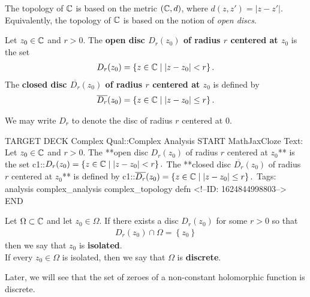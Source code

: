 \documentclass{memoir}
\begin{document}
The topology of \(\mathbb{C}\) is based on the metric \((\mathbb{C},d)\), where \(d(z,z') = \left| z-z' \right| \).  Equivalently, the topology of \(\mathbb{C}\) is based on the notion of \textit{open discs}.
\begin{defn}
	Let \(z_0 \in \mathbb{C}\) and \(r>0\). The \textbf{open disc \(D_r(z_0)\) of radius \(r\) centered at \(z_0\)} is the set
	\begin{align*}
		D_r(z_0) = \left\{z \in \mathbb{C} \mid \left| z-z_0 \right| <r \right\} .
	\end{align*}
The \textbf{closed disc \(\overline{D_r}(z_0)\) of radius \(r\) centered at \(z_0\)} is defined by
	\begin{align*}
	\overline{D_r}(z_0) = \left\{z \in \mathbb{C} \mid |z-z_0|\leq r \right\} .
	\end{align*}
\end{defn}
We may write \(D_r\) to denote the disc of radius \(r\) centered at \(0\).

\begin{anki}
TARGET DECK
Complex Qual::Complex Analysis
START
MathJaxCloze
Text: Let \(z_0 \in \mathbb{C}\) and \(r>0\). The **open disc \(D_r(z_0)\) of radius \(r\) centered at \(z_0\)** is the set
 {{c1::\(\begin{align*}
         	D_r(z_0) = \left\{z \in \mathbb{C} \mid \left| z-z_0 \right| <r \right\} .
         \end{align*}\)}}
The **closed disc \(\overline{D_r}(z_0)\) of radius \(r\) centered at \(z_0\)** is defined by
{{c1::\(\begin{align*}
        \overline{D_r}(z_0) = \left\{z \in \mathbb{C} \mid |z-z_0|\leq r \right\} .
        \end{align*}\)}}
Tags: analysis complex_analysis complex_topology defn
<!--ID: 1624844998803-->
END
\end{anki}

\begin{defn}
	Let \(\Omega \subset \mathbb{C}\) and let \(z_0 \in \Omega \). If there exists a disc \(D_{r}(z_0)\) for some \(r>0\) so that
	 \begin{align*}
		 D_r(z_0) \cap \Omega = \left\{ z_0 \right\}
	\end{align*}
then we say that \(z_0\) is \textbf{isolated}.\\

If every \(z_0 \in \Omega \) is isolated, then we say that \(\Omega \) is \textbf{discrete}.
\end{defn}
Later, we will see that the set of zeroes of a non-constant holomorphic function is discrete.
\end{document}
